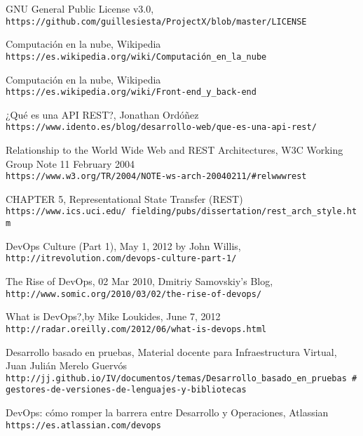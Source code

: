 \begin{thebibliography}{999}

GNU General Public License v3.0,
\\\texttt{https://github.com/guillesiesta/ProjectX/blob/master/LICENSE}

Computación en la nube, Wikipedia
\\\texttt{https://es.wikipedia.org/wiki/Computación\_en\_la\_nube}

Computación en la nube, Wikipedia
\\\texttt{https://es.wikipedia.org/wiki/Front-end\_y\_back-end}

¿Qué es una API REST?, Jonathan Ordóñez
\\\texttt{https://www.idento.es/blog/desarrollo-web/que-es-una-api-rest/}

Relationship to the World Wide Web and REST Architectures, W3C Working Group Note 11 February 2004
\\\texttt{https://www.w3.org/TR/2004/NOTE-ws-arch-20040211/\#relwwwrest}

CHAPTER 5, Representational State Transfer (REST)
\\\texttt{https://www.ics.uci.edu/~fielding/pubs/dissertation/rest\_arch\_style.htm}

DevOps Culture (Part 1), May 1, 2012 by John Willis,
\\\texttt{http://itrevolution.com/devops-culture-part-1/}

The Rise of DevOps, 02 Mar 2010, Dmitriy Samovskiy's Blog,
\\\texttt{http://www.somic.org/2010/03/02/the-rise-of-devops/}

What is DevOps?,by Mike Loukides, June 7, 2012
\\\texttt{http://radar.oreilly.com/2012/06/what-is-devops.html}

Desarrollo basado en pruebas, Material docente para Infraestructura Virtual, Juan Julián Merelo Guervós
\\\texttt{http://jj.github.io/IV/documentos/temas/Desarrollo\_basado\_en\_pruebas\
\#gestores-de-versiones-de-lenguajes-y-bibliotecas}

DevOps: cómo romper la barrera entre Desarrollo y Operaciones, Atlassian
\\\texttt{https://es.atlassian.com/devops}


\end{thebibliography}
